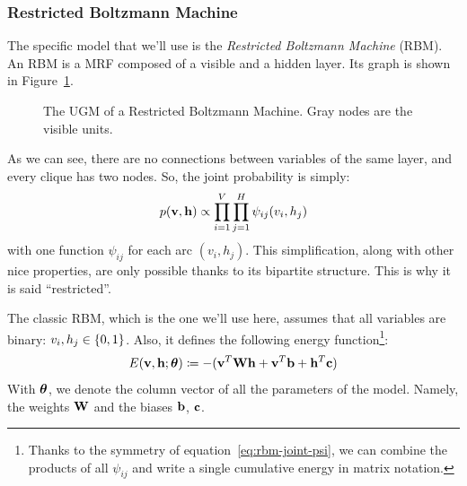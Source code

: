 \subsubsection*{Restricted Boltzmann Machine}

The specific model that we'll use is the \emph{Restricted Boltzmann Machine}
(RBM). An RBM is a MRF
composed of a visible and a hidden layer. Its graph is shown in
Figure~\ref{fig:rbm}.
\begin{figure}
	\centering
	\caption{The UGM of a Restricted Boltzmann Machine. Gray nodes are the
	visible units.}
	\label{fig:rbm}
\end{figure}
As we can see, there are no connections between variables of the same layer,
and every clique has two nodes. So, the joint probability is simply:
\begin{equation}
	p(\mathbf{v}, \mathbf{h}) \propto \prod_{i=1}^{V} \prod_{j=1}^{H} \psi_{ij}(v_i, h_j)
	\label{eq:rbm-joint-psi}
\end{equation}
with one function $\psi_{ij}$ for each arc $(v_i, h_j)$. This simplification,
along with other nice properties, are only possible thanks to its bipartite
structure. This is why it is said ``restricted''.

The classic RBM, which is the one we'll use here, assumes that all variables
are binary: $v_i, h_j \in \{0,1\}$. Also, it defines the following energy
function\footnote{Thanks to the symmetry of equation~\eqref{eq:rbm-joint-psi},
we can combine the products of all $\psi_{ij}$ and write a single cumulative
energy in matrix notation.}:
\begin{equation}
	E(\mathbf{v},\mathbf{h}; \bm{\theta}) \coloneqq -( \mathbf{v}^T \mathbf{W} \mathbf{h} + \mathbf{v}^T \mathbf{b} +
	\mathbf{h}^T \mathbf{c})
	\label{eq:rbm-energy}
\end{equation}
With $\bm{\theta}$, we denote the column vector of all the parameters of the
model. Namely, the weights $\mathbf{W}$ and the biases $\mathbf{b}$, $\mathbf{c}$.

